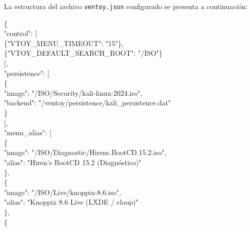 \documentclass[12pt]{article}
\begin{document}
La estructura del archivo \texttt{ventoy.json} configurado se presenta a continuación:

\begin{mdframed}[style=terminal]
\ttfamily\upshape\color{bashLetterColor}\footnotesize
\{ \\
\hspace*{1em}"control": [ \\
\hspace*{2em}\{"VTOY\_MENU\_TIMEOUT": "15"\}, \\
\hspace*{2em}\{"VTOY\_DEFAULT\_SEARCH\_ROOT": "/ISO"\} \\
\hspace*{1em}], \\
\hspace*{1em}"persistence": [ \\
\hspace*{2em}\{ \\
\hspace*{3em}"image": "/ISO/Security/kali-linux-2024.iso", \\
\hspace*{3em}"backend": "/ventoy/persistence/kali\_persistence.dat" \\
\hspace*{2em}\} \\
\hspace*{1em}], \\
\hspace*{1em}"menu\_alias": [ \\
\hspace*{2em}\{ \\
\hspace*{3em}"image": "/ISO/Diagnostic/Hirens.BootCD.15.2.iso", \\
\hspace*{3em}"alias": "Hiren's BootCD 15.2 (Diagnóstico)" \\
\hspace*{2em}\}, \\
\hspace*{2em}\{ \\
\hspace*{3em}"image": "/ISO/Live/knoppix-8.6.iso", \\
\hspace*{3em}"alias": "Knoppix 8.6 Live (LXDE / cloop)" \\
\hspace*{2em}\}, \\
\hspace*{2em}\{ \\

\end{mdframed}
\end{document}
